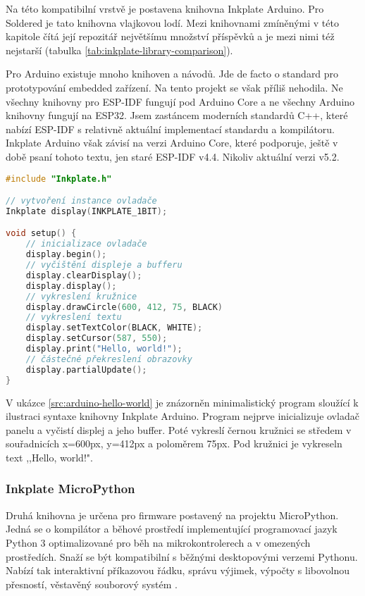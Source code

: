 Na této kompatibilní vrstvě je postavena knihovna Inkplate Arduino. Pro Soldered je tato knihovna vlajkovou lodí. Mezi knihovnami zmíněnými v této kapitole čítá její repozitář největšímu množství příspěvků a je mezi nimi též nejstarší (tabulka \ref{tab:inkplate-library-comparison}).

Pro Arduino existuje mnoho knihoven a návodů. Jde de facto o standard pro prototypování embedded zařízení. Na tento projekt se však příliš nehodila. Ne všechny knihovny pro ESP-IDF fungují pod Arduino Core a ne všechny Arduino knihovny fungují na ESP32. Jsem zastáncem moderních standardů C++, které nabízí ESP-IDF s relativně aktuální implementací standardu a kompilátoru. Inkplate Arduino však závisí na verzi Arduino Core, které podporuje, ještě v době psaní tohoto textu, jen staré ESP-IDF v4.4. Nikoliv aktuální verzi v5.2.

\begin{lstlisting}[label=src:arduino-hello-world,language=C++,caption={Ilustrační použití knihovny Inkplate Arduino}]
#include "Inkplate.h"

// vytvoření instance ovladače
Inkplate display(INKPLATE_1BIT);

void setup() {
    // inicializace ovladače
    display.begin();
    // vyčištění displeje a bufferu
    display.clearDisplay();
    display.display();
    // vykreslení kružnice
    display.drawCircle(600, 412, 75, BLACK)
    // vykreslení textu
    display.setTextColor(BLACK, WHITE);
    display.setCursor(587, 550);
    display.print("Hello, world!");
    // částečné překreslení obrazovky
    display.partialUpdate();
}
\end{lstlisting}

V ukázce \ref{src:arduino-hello-world} je znázorněn minimalistický program sloužící k ilustraci syntaxe knihovny Inkplate Arduino. Program nejprve inicializuje ovladač panelu a vyčistí displej a jeho buffer. Poté vykreslí černou kružnici se středem v souřadnicích x=600px, y=412px a poloměrem 75px. Pod kružnici je vykreseln text ,,Hello, world!".

\subsubsection{Inkplate MicroPython}
Druhá knihovna je určena pro firmware postavený na projektu MicroPython. Jedná se o kompilátor a běhové prostředí implementující programovací jazyk Python 3 optimalizované pro běh na mikrokontrolerech a v omezených prostředích. Snaží se být kompatibilní s běžnými desktopovými verzemi Pythonu. Nabízí tak interaktivní příkazovou řádku, správu výjimek, výpočty s libovolnou přesností, věstavěný souborový systém \cite{MicroPythonPythonMicrocontrollers}.

